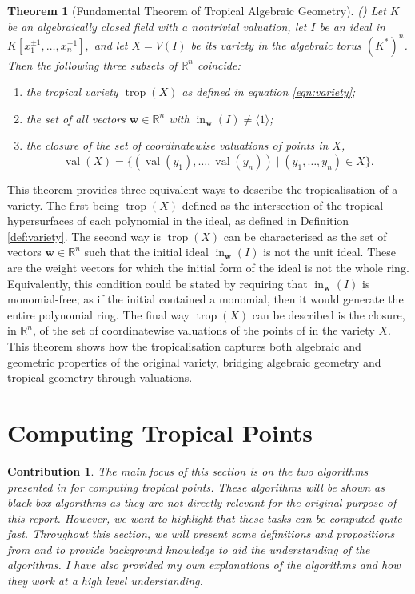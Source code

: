 \documentclass[11pt,reqno,a4paper]{article}
\theoremstyle{theoremstyle}
\newtheorem{theorem}{Theorem}[subsection]
\theoremstyle{examplestyle}
\newtheorem*{contribution*}{Contribution}
\theoremstyle{algorithmstyle}
\numberwithin{equation}{subsection}
\newcommand{\RR}{\mathbb{R}}
\DeclareMathOperator{\trop}{trop}
\DeclareMathOperator{\val}{val}
\DeclareMathOperator{\initial}{in}
\begin{document}
\begin{theorem}[Fundamental Theorem of Tropical Algebraic Geometry]
    (\cite[Thm. 3.2.3]{MS2015})  Let $K$ be an algebraically closed field with a nontrivial valuation, let $I$ be an ideal in $K[x_1^{\pm1},\ldots,x_n^{\pm1}],$ and let $X = V(I)$ be its variety in the algebraic torus $(K^*)^n$. Then the following three subsets of $\RR^n$ coincide:
    \begin{enumerate}
        \item[(1)] the tropical variety $\trop(X)$ as defined in equation \ref{eqn:variety};
        \item[(2)] the set of all vectors $\mathbf{w} \in \RR^n$ with $\initial_\mathbf{w}(I) \neq \langle1\rangle$;
        \item[(3)] the closure of the set of coordinatewise valuations of points in $X$,
        \[\val(X) = \{(\val(y_1), \ldots,\val(y_n)) \; |\; (y_1,\ldots,y_n) \in X\}.\]
    \end{enumerate}
\end{theorem}

This theorem provides three equivalent ways to describe the tropicalisation of a variety. The first being $\trop(X)$ defined as the intersection of the tropical hypersurfaces of each polynomial in the ideal, as defined in Definition \ref{def:variety}. The second way is $\trop(X)$ can be characterised as the set of vectors $\textbf{w} \in \RR^n$ such that the initial ideal $\initial_\textbf{w}(I)$ is not the unit ideal. These are the weight vectors for which the initial form of the ideal is not the whole ring. Equivalently, this condition could be stated by requiring that $\initial_\textbf{w}(I)$ is monomial-free; as if the initial contained a monomial, then it would generate the entire polynomial ring. The final way $\trop(X)$ can be described is the closure, in $\RR^n$, of the set of coordinatewise valuations of the points of in the variety $X$. This theorem shows how the tropicalisation captures both algebraic and geometric properties of the original variety, bridging algebraic geometry and tropical geometry through valuations.

\section{Computing Tropical Points}

\begin{contribution*}
    The main focus of this section is on the two algorithms presented in \cite{HR2018} for computing tropical points. These algorithms will be shown as black box algorithms as they are not directly relevant for the original purpose of this report. However, we want to highlight that these tasks can be computed quite fast. Throughout this section, we will present some definitions and propositions from \cite{HR2018} and \cite{GP2007} to provide background knowledge to aid the understanding of the algorithms. I have also provided my own explanations of the algorithms and how they work at a high level understanding.    
\end{contribution*}
\end{document}
